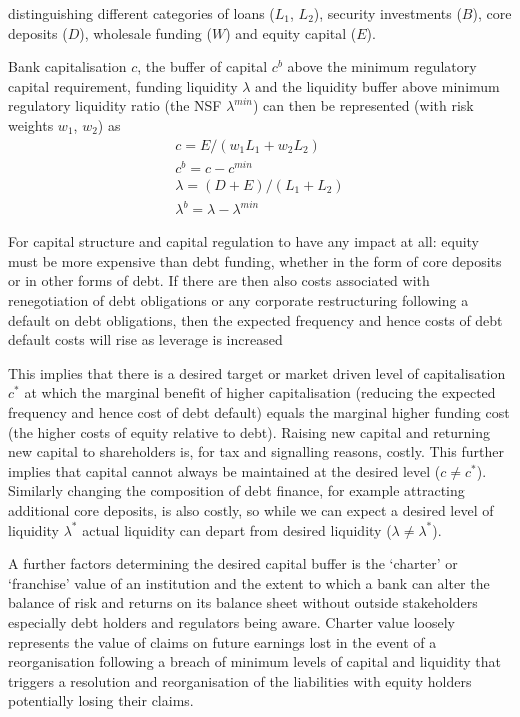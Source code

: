 \documentclass[
  12,
]{article}
\begin{document}
distinguishing different categories of loans (\(L_1\), \(L_2\)), security investments (\(B\)), core deposits (\(D\)), wholesale funding (\(W\)) and equity capital (\(E\)).

Bank capitalisation \(c\), the buffer of capital \(c^b\) above the minimum regulatory capital requirement, funding liquidity \(\lambda\) and the liquidity buffer above minimum regulatory liquidity ratio (the NSF \(\lambda^{min}\)) can then be represented (with risk weights \(w_1\), \(w_2\)) as
\[
\begin{split}
c=E/(w_1 L_1+ w_2 L_2)\\
c^b =c-c^{min}\\
\lambda =(D+E)/(L_1+L_2)\\
\lambda^{b}=\lambda-\lambda^{min}
\end{split}
\]

For capital structure and capital regulation to have any impact at all: equity must be more expensive than debt funding, whether in the form of core deposits or in other forms of debt. If there are then also costs associated with renegotiation of debt obligations or any corporate restructuring following a default on debt obligations, then the expected frequency and hence costs of debt default costs will rise as leverage is increased

This implies that there is a desired target or market driven level of capitalisation \(c^\ast\) at which the marginal benefit of higher capitalisation (reducing the expected frequency and hence cost of debt default) equals the marginal higher funding cost (the higher costs of equity relative to debt). Raising new capital and returning new capital to shareholders is, for tax and signalling reasons, costly. This further implies that capital cannot always be maintained at the desired level (\(c \neq c^\ast\)). Similarly changing the composition of debt finance, for example attracting additional core deposits, is also costly, so while we can expect a desired level of liquidity \(\lambda^\ast\) actual liquidity can depart from desired liquidity (\(\lambda \neq \lambda^\ast\)).

A further factors determining the desired capital buffer is the `charter' or `franchise' value of an institution and the extent to which a bank can alter the balance of risk and returns on its balance sheet without outside stakeholders especially debt holders and regulators being aware. Charter value loosely represents the value of claims on future earnings lost in the event of a reorganisation following a breach of minimum levels of capital and liquidity that triggers a resolution and reorganisation of the liabilities with equity holders potentially losing their claims.
\end{document}
